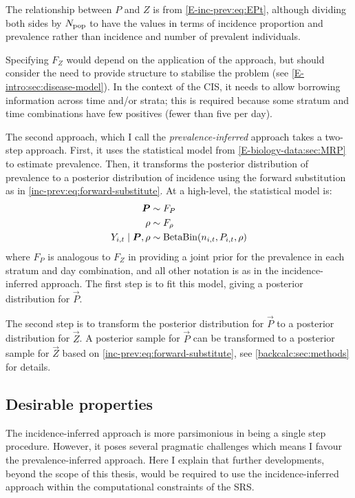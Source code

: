 \documentclass[thesis.tex]{subfiles}
\begin{document}
The relationship between $P$ and $Z$ is from \cref{E-inc-prev:eq:EPt}, although dividing both sides by $N_\text{pop}$ to have the values in terms of incidence proportion and prevalence rather than incidence and number of prevalent individuals.

Specifying $F_Z$ would depend on the application of the approach, but should consider the need to provide structure to stabilise the problem (see \cref{E-intro:sec:disease-model}).
In the context of the CIS, it needs to allow borrowing information across time and/or strata; this is required because some stratum and time combinations have few positives (fewer than five per day).

The second approach, which I call the \emph{prevalence-inferred} approach takes a two-step approach.
First, it uses the statistical model from \cref{E-biology-data:sec:MRP} to estimate prevalence.
Then, it transforms the posterior distribution of prevalence to a posterior distribution of incidence using the forward substitution as in \cref{inc-prev:eq:forward-substitute}.
At a high-level, the statistical model is:
\begin{align}
    \bm{P}  &\sim F_P \\
    \rho &\sim F_\rho \\
    Y_{i,t} \mid \bm{P}, \rho &\sim \operatorname{BetaBin}(n_{i,t}, P_{i,t}, \rho)
\end{align}
where $F_P$ is analogous to $F_Z$ in providing a joint prior for the prevalence in each stratum and day combination, and all other notation is as in the incidence-inferred approach.
The first step is to fit this model, giving a posterior distribution for $\vec{P}$.

The second step is to transform the posterior distribution for $\vec{P}$ to a posterior distribution for $\vec{Z}$.
A posterior sample for $\vec{P}$ can be transformed to a posterior sample for $\vec{Z}$ based on \cref{inc-prev:eq:forward-substitute}, see \cref{backcalc:sec:methods} for details.

\subsection{Desirable properties}

The incidence-inferred approach is more parsimonious in being a single step procedure.
However, it poses several pragmatic challenges which means I favour the prevalence-inferred approach.
Here I explain that further developments, beyond the scope of this thesis, would be required to use the incidence-inferred approach within the computational constraints of the SRS.
\end{document}
